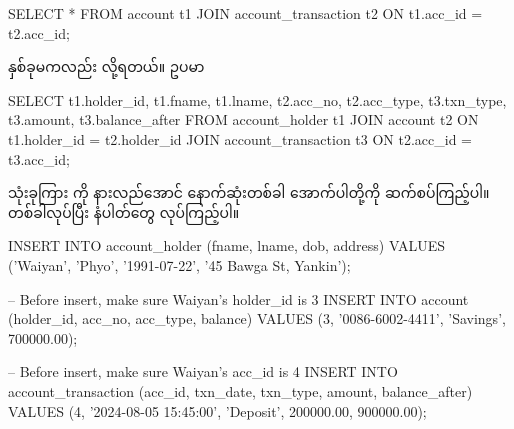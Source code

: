 %
\begin{sql}
SELECT 
    *
FROM account t1 JOIN account_transaction t2
    ON t1.acc_id = t2.acc_id;
\end{sql}
%
 နှစ်ခုမကလည်း  လို့ရတယ်။ ဥပမာ 
%
\begin{sql}
SELECT 
    t1.holder_id,
    t1.fname,
    t1.lname,
    t2.acc_no,
    t2.acc_type,
    t3.txn_type,
    t3.amount,
    t3.balance_after
FROM account_holder t1 JOIN account t2
    ON t1.holder_id = t2.holder_id
JOIN account_transaction t3
    ON t2.acc_id = t3.acc_id;
\end{sql}
%

 သုံးခုကြား  ကို နားလည်အောင် နောက်ဆုံးတစ်ခါ အောက်ပါတို့ကို ဆက်စပ်ကြည့်ပါ။  တစ်ခါလုပ်ပြီး  နံပါတ်တွေ  လုပ်ကြည့်ပါ။
%
\begin{sql}
INSERT INTO account_holder (fname, lname, dob, address)
VALUES 
('Waiyan', 'Phyo', '1991-07-22', '45 Bawga St, Yankin');
\end{sql}
%
%
\begin{sql}
-- Before insert, make sure Waiyan's holder_id is 3
INSERT INTO account (holder_id, acc_no, acc_type, balance)
VALUES 
(3, '0086-6002-4411', 'Savings', 700000.00);
\end{sql}
%

%
\begin{sql}
-- Before insert, make sure Waiyan's acc_id is 4
INSERT INTO account_transaction 
    (acc_id, txn_date, txn_type, amount, balance_after)
VALUES 
    (4, '2024-08-05 15:45:00', 'Deposit', 200000.00, 900000.00);
\end{sql}
%


